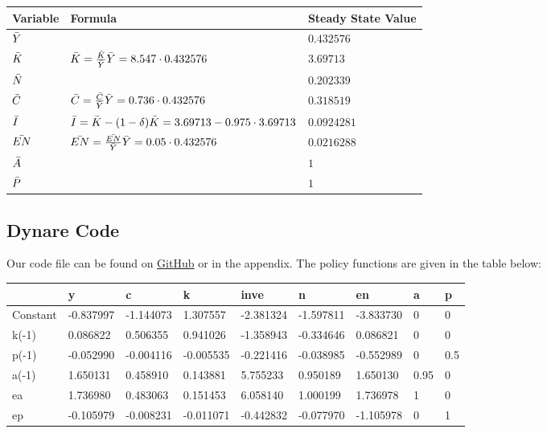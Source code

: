 \documentclass[a4paper,11pt]{article}
\begin{document}
\begin{longtable}[c]{@{}lll@{}}
\toprule
Variable    & Formula & Steady State Value   \\* \midrule
\endfirsthead
\endhead
\bottomrule
\endfoot
\endlastfoot
$\Bar{Y}$ & &$0.432576$\\
$\Bar{K}$ & $\Bar{K} = \frac{\Bar{K}}{\Bar{Y}}\Bar{Y}=8.547\cdot0.432576$ & $3.69713$\\
$\Bar{N}$ & &$0.202339$\\
$\Bar{C}$ & $\Bar{C} = \frac{\Bar{C}}{\Bar{Y}}\Bar{Y}=0.736\cdot 0.432576$ & $0.318519$\\
$\Bar{I}$ & $\Bar{I} = \Bar{K} - (1-\delta)\Bar{K} = 3.69713-0.975\cdot3.69713$ & $0.0924281$\\
$\Bar{EN}$ & $\Bar{EN} = \frac{\Bar{EN}}{\Bar{Y}}\Bar{Y} = 0.05\cdot 0.432576$ & $0.0216288$\\
$\Bar{A}$ & &$1$\\
$\Bar{P}$ & &$1$\\* \bottomrule
\end{longtable}

\subsection{Dynare Code}
Our code file can be found on \href{https://github.com/therealLucasPaul/AdvMacroeconomics2_Assignments}{GitHub} or in the appendix. The policy functions are given in the table below:
\begin{table}[H]
\centering
\begin{tabular}{@{}l|llllllll@{}}
\toprule
         & y         & c         & k         & inve      & n         & en        & a        & p        \\ \midrule
Constant & -0.837997 & -1.144073 & 1.307557  & -2.381324 & -1.597811 & -3.833730 & 0        & 0        \\
k(-1)    & 0.086822  & 0.506355  & 0.941026  & -1.358943 & -0.334646 & 0.086821  & 0        & 0        \\
p(-1)    & -0.052990 & -0.004116 & -0.005535 & -0.221416 & -0.038985 & -0.552989 & 0        & 0.5 \\
a(-1)    & 1.650131  & 0.458910  & 0.143881  & 5.755233  & 0.950189  & 1.650130  & 0.95 & 0        \\
ea       & 1.736980  & 0.483063  & 0.151453  & 6.058140  & 1.000199  & 1.736978  & 1 & 0        \\
ep       & -0.105979 & -0.008231 & -0.011071 & -0.442832 & -0.077970 & -1.105978 & 0        & 1 \\ \bottomrule
\end{tabular}
\end{table}
\end{document}
